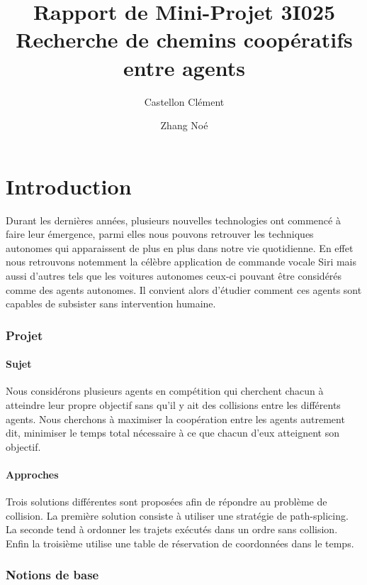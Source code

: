 \documentclass[a4paper, twocolumn]{article}
\begin{document}
	\title{Rapport de Mini-Projet 3I025 \\
		\large Recherche de chemins coopératifs entre agents}
	\author{Castellon Clément \and Zhang Noé}
	\maketitle

	\part{Introduction}
	
		Durant les dernières années, plusieurs nouvelles technologies ont commencé à faire leur émergence, parmi elles nous pouvons retrouver les techniques autonomes qui apparaissent de plus en plus dans notre vie quotidienne. En effet nous retrouvons notemment la célèbre application de commande vocale Siri mais aussi d'autres tels que les voitures autonomes ceux-ci pouvant être considérés comme des agents autonomes.
		Il convient alors d'étudier comment ces agents sont capables de subsister sans intervention humaine. 
		
		\section{Projet}
		
		\subsection{Sujet}
		Nous considérons plusieurs agents en compétition qui cherchent chacun à atteindre leur propre objectif sans qu'il y ait des collisions entre les différents agents.
		Nous cherchons à maximiser la coopération entre les agents autrement dit, minimiser le temps total nécessaire à ce que chacun d'eux atteignent son objectif.
		
		\subsection{Approches}
		Trois solutions différentes sont proposées afin de répondre au problème de collision. La première solution consiste à utiliser une stratégie de path-splicing. La seconde tend à ordonner les trajets exécutés dans un ordre sans collision. Enfin la troisième utilise une table de réservation de coordonnées dans le temps.
	
		\section{Notions de base}
		
\end{document}
